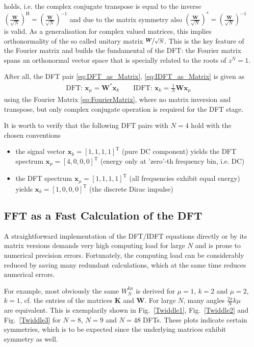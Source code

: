 \documentclass[11pt,a4paper,DIV=12]{scrartcl}
\begin{document}
holds, i.e. the complex conjugate transpose is equal to the inverse
$\left(\frac{\mathbf{W}}{\sqrt{N}}\right)^\mathrm{H} =
\left(\frac{\mathbf{W}}{\sqrt{N}} \right)^{-1}$
and due to the matrix symmetry also
$\left(\frac{\mathbf{W}}{\sqrt{N}}\right)^* =
\left(\frac{\mathbf{W}}{\sqrt{N}} \right)^{-1}$
is valid.
%
As a generalisation for complex valued matrices, this implies orthonormality of
the so called unitary matrix $\nicefrac{\bm W}{\sqrt{N}}$.
%
This is the key feature of the Fourier matrix and builds the fundamental of the
DFT:
%
the Fourier matrix spans an orthonormal vector space that is specially
related to the roots of $z^N=1$.
%
\begin{framed}
After all, the DFT pair \eqref{eq:DFT_as_Matrix}, \eqref{eq:IDFT_as_Matrix}
is given as
\begin{align}
\text{ DFT: }\bm{x}_\mu = \bm{W}^* \bm{x}_k\qquad
\text{IDFT: }\bm{x}_k = \frac{1}{N} \bm{W} \bm{x}_\mu
\end{align}
using the Fourier Matrix \eqref{eq:FourierMatrix}, where no matrix inversion
and transpose, but only complex conjugate operation is required for the DFT stage.
\end{framed}
%
It is worth to verify that the following DFT pairs with $N=4$ hold with the
chosen conventions
\begin{itemize}
  \item the signal vector $\mathbf{x}_k=[1,1,1,1]^\mathrm{T}$ (pure DC component)
  yields the DFT spectrum $\mathbf{x}_\mu = [4,0,0,0]^\mathrm{T}$
  (energy only at 'zero'-th frequency bin, i.e. DC)
  \item the DFT spectrum $\mathbf{x}_\mu = [1,1,1,1]^\mathrm{T}$
  (all frequencies exhibit equal energy) yields $\mathbf{x}_k = [1,0,0,0]^\mathrm{T}$
  (the discrete Dirac impulse)
\end{itemize}

\subsection{FFT as a Fast Calculation of the DFT}
%
A straightforward implementation of the DFT/IDFT equations directly or
by its matrix versions demands very high computing load for large $N$ and
is prone to numerical precision errors.
%
Fortunately, the computing load can be considerably reduced by saving many
redundant calculations, which at the same time reduces numerical errors.
%

For example, most obviously the same $W_N^{k\mu}$ is derived for $\mu=1$, $k=2$
and $\mu=2$, $k=1$, cf. the entries of the matrices $\mathbf{K}$ and $\mathbf{W}$.
%
For large $N$, many angles $\frac{2\pi}{N}k\mu$ are equivalent.
%
This is exemplarily shown in Fig.~\ref{Twiddle1}, Fig.~\ref{Twiddle2} and
Fig.~\ref{Twiddle3} for $N=8$, $N=9$ and $N=48$ DFTs.
%
These plots indicate certain symmetries, which is to be expected since the
underlying matrices exhibit symmetry as well.
\end{document}
